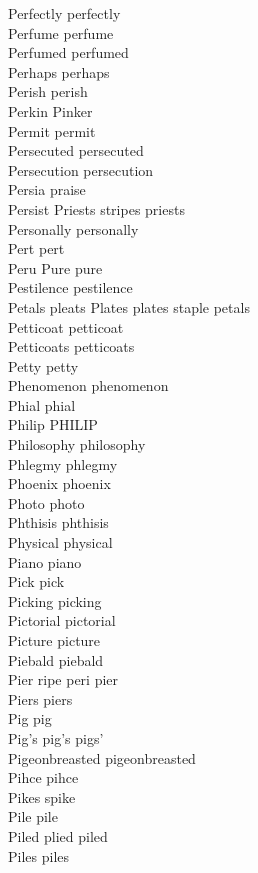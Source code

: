 Perfectly perfectly\\
Perfume perfume\\
Perfumed perfumed\\
Perhaps perhaps\\
Perish perish\\
Perkin Pinker\\
Permit permit\\
Persecuted persecuted\\
Persecution persecution\\
Persia praise\\
Persist Priests stripes priests\\
Personally personally\\
Pert pert\\
Peru Pure pure\\
Pestilence pestilence\\
Petals pleats Plates plates staple petals\\
Petticoat petticoat\\
Petticoats petticoats\\
Petty petty\\
Phenomenon phenomenon\\
Phial phial\\
Philip PHILIP\\
Philosophy philosophy\\
Phlegmy phlegmy\\
Phoenix phoenix\\
Photo photo\\
Phthisis phthisis\\
Physical physical\\
Piano piano\\
Pick pick\\
Picking picking\\
Pictorial pictorial\\
Picture picture\\
Piebald piebald\\
Pier ripe peri pier\\
Piers piers\\
Pig pig\\
Pig's pig's pigs'\\
Pigeonbreasted pigeonbreasted\\
Pihce pihce\\
Pikes spike\\
Pile pile\\
Piled plied piled\\
Piles piles\\
